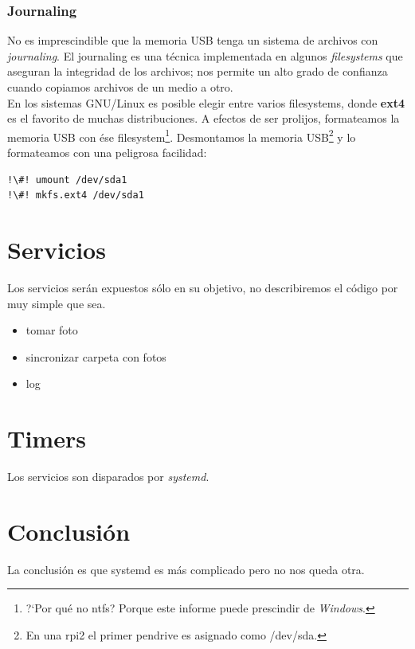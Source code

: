 \documentclass[10pt,a4paper]{article}
\begin{document}
\subsubsection{Journaling}

No es imprescindible que la memoria USB tenga un sistema de archivos con \emph{journaling}. El journaling es una t\'ecnica implementada en algunos \emph{filesystems} que aseguran la integridad de los archivos; nos permite un alto grado de confianza cuando copiamos archivos de un medio a otro.\\

En los sistemas GNU/Linux es posible elegir entre varios filesystems, donde \textbf{ext4} es el favorito de muchas distribuciones. A efectos de ser prolijos, formateamos la memoria USB con \'ese filesystem\footnote{?`Por qu\'e no ntfs? Porque este informe puede prescindir de \emph{Windows}.}. Desmontamos la memoria USB\footnote{En una rpi2 el primer pendrive es asignado como /dev/sda.} y lo formateamos con una peligrosa facilidad:
\begin{lstlisting}
!\#! umount /dev/sda1
!\#! mkfs.ext4 /dev/sda1
\end{lstlisting}

\section{Servicios}

Los servicios ser\'an expuestos s\'olo en su objetivo, no describiremos el c\'odigo por muy simple que sea.
\begin{itemize}
    \item tomar foto
    \item sincronizar carpeta con fotos
    \item log
\end{itemize}

\section{Timers}

Los servicios son disparados por \emph{systemd}.

\section{Conclusi\'on}

La conclusi\'on es que systemd es m\'as complicado pero no nos queda otra.
\end{document}
